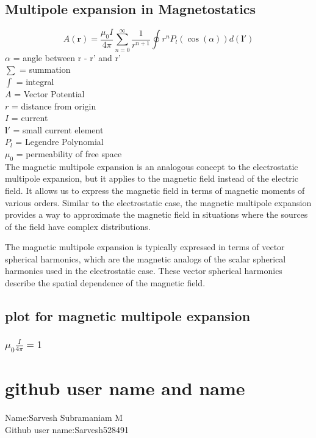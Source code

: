 \documentclass[12pt,a4paper]{article}
\begin{document}
\subsection{Multipole expansion in Magnetostatics}
\begin{equation}
A(\mathbf{r}) = \frac{\mu_0I}{4\pi} \sum_{n=0}^{\infty} \frac{1}{r^{n+1}} \oint r^{n} P_l(\cos(\alpha))d(\mathbf{l}') 
\end{equation}
$\alpha$ = angle between r - r' and r'\\
$\sum$ = summation\\
$\int$ = integral\\
$A$ = Vector Potential\\
$r$ = distance from origin \\
$I$ = current\\
$\mathbf{l}'$ = small current element\\
$P_l$ = Legendre Polynomial \\
$\mu_0$ = permeability of free space\\
The magnetic multipole expansion is an analogous concept to the electrostatic multipole expansion, but it applies to the magnetic field instead of the electric field. It allows us to express the magnetic field in terms of magnetic moments of various orders. Similar to the electrostatic case, the magnetic multipole expansion provides a way to approximate the magnetic field in situations where the sources of the field have complex distributions.

The magnetic multipole expansion is typically expressed in terms of vector spherical harmonics, which are the magnetic analogs of the scalar spherical harmonics used in the electrostatic case. These vector spherical harmonics describe the spatial dependence of the magnetic field.

\subsection{plot for magnetic multipole expansion}
\subsubsection{$\mu_0\frac{I}{4\pi} = 1$}


\section{github user name and name}
Name:Sarvesh Subramaniam M \\
Github user name:Sarvesh528491\\
\end{document}
